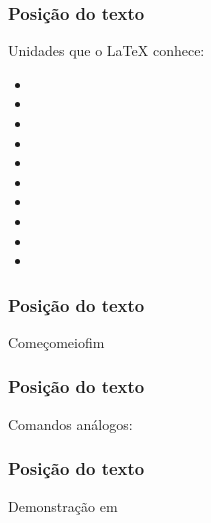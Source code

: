\begin{frame}[fragile]
  \frametitle{Posição do texto}
  \LARGE
  Unidades que o \LaTeX{} conhece:

  \begin{multicols}{2}
    \begin{itemize}
      \item{}
      \item{}
      \item{}
      \item{}
      \item{}
      \item{}
      \item\latexcode{\textheight}
      \item\latexcode{\textwidth}
      \item\latexcode{\pageheight}
      \item\latexcode{\pageheight}
    \end{itemize}
  \end{multicols}
\end{frame}

\begin{frame}[fragile]
  \frametitle{Posição do texto}
  \LARGE
  \vspace{1em}

  Começo\hfill meio\hfill fim
\end{frame}

\begin{frame}[fragile]
  \frametitle{Posição do texto}
  \LARGE
  Comandos análogos:

  \latexcode{\vspace{comprimento}}
  \vspace{1em}

  \latexcode{\vfill}
\end{frame}

\begin{frame}
  \frametitle{Posição do texto}
  \huge
  Demonstração em 
\end{frame}

